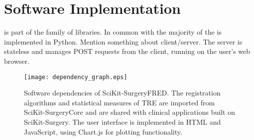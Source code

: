 \section{Software Implementation}
\fred is part of the \sksurgery\cite{PMID:32436132} family of libraries. In common with \sksurgery the majority of the \fred is implemented in Python.  
Mention something about client/server. The server is stateless and manages POST requests from the client, running on the user's web browser.

\begin{figure}
	\begin{center}
	\texttt{[image: dependency\_graph.eps]}
		\caption{\label{fig:dependencies}Software dependencies of SciKit-SurgeryFRED. The registration algorithms and statistical measures of {TRE} are imported from SciKit-SurgeryCore and are shared with clinical applications built on SciKit-Surgery. The user interface is implemented in HTML and JavaScript, using Chart.js for plotting functionality.}
	\end{center}
\end{figure}

